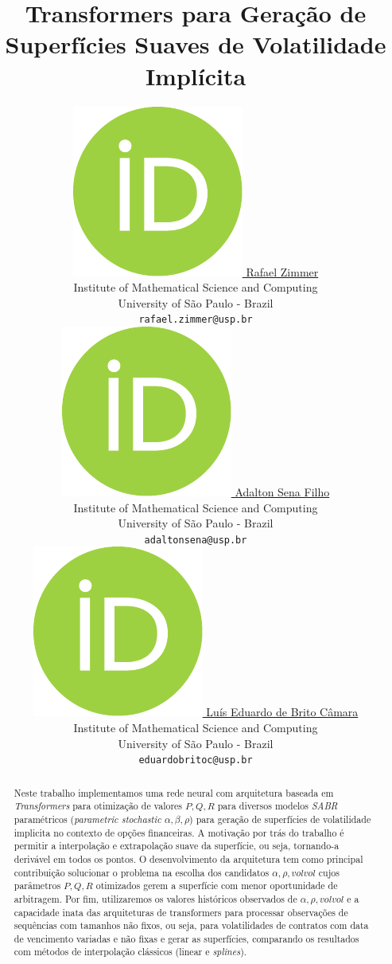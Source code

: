 \documentclass{article}
\title{Transformers para Geração de Superfícies Suaves de Volatilidade Implícita}
\author{ 
	\href{https://orcid.org/0009-0008-6064-9895}{
		\includegraphics[scale=0.06]{resources/orcid.pdf}
		\hspace{1mm}Rafael Zimmer
	}\\
	Institute of Mathematical Science and Computing\\
	University of São Paulo - Brazil \\
	\texttt{rafael.zimmer@usp.br} \\
	\And
	\href{https://orcid.org/0000-0000-0000-0000}{
		\includegraphics[scale=0.06]{resources/orcid.pdf}
		\hspace{1mm}Adalton Sena Filho
	}\\
	Institute of Mathematical Science and Computing\\
	University of São Paulo - Brazil \\
	\texttt{adaltonsena@usp.br} \\
	\And
	\href{https://orcid.org/0000-0000-0000-0000}{
		\includegraphics[scale=0.06]{resources/orcid.pdf}
		\hspace{1mm}Luís Eduardo de Brito Câmara
	}\\
	Institute of Mathematical Science and Computing\\
	University of São Paulo - Brazil \\
	\texttt{eduardobritoc@usp.br} \\
}
\begin{document}
	
	\maketitle
	
	\begin{abstract}
		Neste trabalho implementamos uma rede neural com arquitetura baseada em \textit{Transformers} para otimização de valores $P, Q, R$ para diversos modelos \textit{SABR} paramétricos (\textit{parametric stochastic $\alpha, \beta, \rho$}) para geração de superfícies de volatilidade implicita no contexto de opções financeiras. A motivação por trás do trabalho é permitir a interpolação e extrapolação suave da superfície, ou seja, tornando-a derivável em todos os pontos. O desenvolvimento da arquitetura tem como principal contribuição solucionar o problema na escolha dos candidatos $\alpha, \rho, volvol$ cujos parâmetros $P, Q, R$ otimizados gerem a superfície com menor oportunidade de arbitragem. Por fim, utilizaremos os valores históricos observados de $\alpha, \rho, volvol$ e a capacidade inata das arquiteturas de transformers para processar observações de sequências com tamanhos não fixos, ou seja, para volatilidades de contratos com data de vencimento variadas e não fixas e gerar as superfícies, comparando os resultados com métodos de interpolação clássicos (linear e \textit{splines}).
	\end{abstract}
	
	
	
	
	
	
	
	
	
	
	
	
\end{document}
